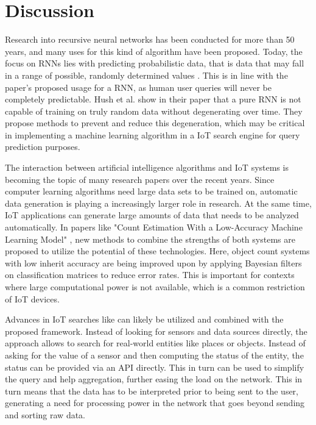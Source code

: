 \documentclass [journal]{IEEEtran}
\begin{document}
 \section{Discussion}
Research into recursive neural networks has been conducted for more than 50 years, and many uses for this kind of algorithm have been proposed. Today, the focus on RNNs lies with predicting probabilistic data, that is data that may fall in a range of possible, randomly determined values \cite{RNNrandom}. This is in line with the paper's proposed usage for a RNN, as human user queries will never be completely predictable. Hush et al. show in their paper that a pure RNN is not capable of training on truly random data without degenerating over time. They propose methods to prevent and reduce this degeneration, which may be critical in implementing a machine learning algorithm in a IoT search engine for query prediction purposes. \par
The interaction between artificial intelligence algorithms and IoT systems is becoming the topic of many research papers over the recent years. Since computer learning algorithms need large data sets to be trained on, automatic data generation is playing a increasingly larger role in research. At the same time, IoT applications can generate large amounts of data that needs to be analyzed automatically. In papers like "Count Estimation With a Low-Accuracy Machine Learning Model"  \cite{count}, new methods to combine the strengths of both systems are proposed to utilize the potential of these technologies. Here, object count systems with low inherit accuracy are being improved upon by applying Bayesian filters on classification matrices to reduce error rates. This is important for contexts where large computational power is not available, which is a common restriction of IoT devices. \par
Advances in IoT searches like \cite{webOfThings} can likely be utilized and combined with the proposed framework. Instead of looking for sensors and data sources directly, the approach allows to search for real-world entities like places or objects. Instead of asking for the value of a sensor and then computing the status of the entity, the status can be provided via an API directly. This in turn can be used to simplify the query and help aggregation, further easing the load on the network. This in turn means that the data has to be interpreted prior to being sent to the user, generating a need for processing power in the network that goes beyond sending and sorting raw data. \par
\end{document}
